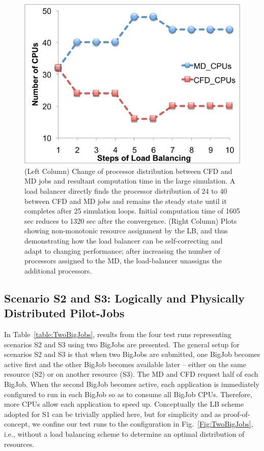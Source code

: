 \documentclass[conference,final]{IEEEtran}
\newcommand{\jhanote}[1]{ {\textcolor{red} { ***Jha: #1 }}}
\newcommand{\jhanote}[1]{}
\begin{document}
\begin{figure}
\includegraphics[scale=0.21]{fig7_22.pdf}
\caption{\small (Left Column) Change of processor distribution between
  CFD and MD jobs and resultant computation time in the large
  simulation. A load balancer directly finds the processor
  distribution of 24 to 40 between CFD and MD jobs and remains the
  steady state until it completes after 25 simulation loops. Initial
  computation time of 1605 sec reduces to 1320 sec after the
  convergence. (Right Column) Plots showing non-monotonic resource
  assignment by the LB, and thus demonstrating how the load balancer
  can be self-correcting and adapt to changing performance; after
  increasing the number of processors assigned to the MD, the
  load-balancer unassigns the additional processors.}
\label{Fig:LBLarge}
\vspace{-1em}
\end{figure}




\subsection{Scenario S2 and S3: Logically and Physically Distributed
  Pilot-Jobs}

In Table~\ref{table:TwoBigJobs}, results from the four test runs
representing scenarios S2 and S3 using two BigJobs are presented.  The
general setup for scenarios S2 and S3 is that when two BigJobs are
submitted, one BigJob becomes active first and the other BigJob
becomes available later -- either on the same resource (S2) or on
another resource (S3).  The MD and CFD request half of each
BigJob. When the second BigJob becomes active, each application is
immediately configured to run in each BigJob so as to consume all
BigJob CPUs. Therefore, more CPUs allow each application to speed
up. Conceptually the LB scheme adopted for S1 can be trivially applied
here, but for simplicity and as proof-of-concept, we confine our test
runs to the configuration in Fig.~\ref{Fig:TwoBigJobs}, i.e., without
a load balancing scheme to determine an optimal distribution of
resources.
\end{document}
